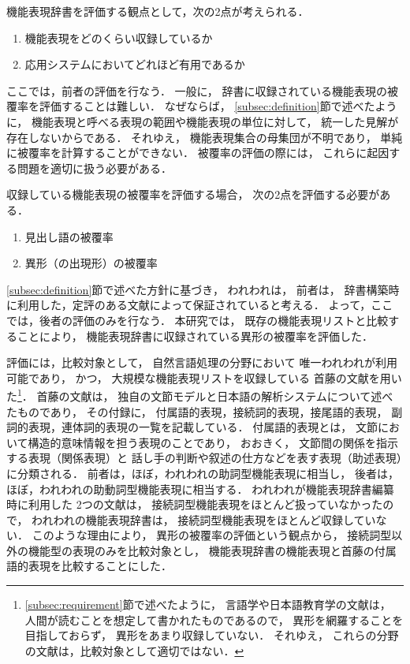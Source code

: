 \documentclass[japanese]{jnlp_1.3e}
\begin{document}
機能表現辞書を評価する観点として，次の2点が考えられる．
\begin{enumerate}
\item 機能表現をどのくらい収録しているか
\item 応用システムにおいてどれほど有用であるか
\end{enumerate}
ここでは，前者の評価を行なう．
一般に，
辞書に収録されている機能表現の被覆率を評価することは難しい．
なぜならば，
\ref{subsec:definition}節で述べたように，
機能表現と呼べる表現の範囲や機能表現の単位に対して，
統一した見解が存在しないからである．
それゆえ，
機能表現集合の母集団が不明であり，
単純に被覆率を計算することができない．
被覆率の評価の際には，
これらに起因する問題を適切に扱う必要がある．

収録している機能表現の被覆率を評価する場合，
次の2点を評価する必要がある．
\begin{enumerate}
\item 見出し語の被覆率
\item 異形（の出現形）の被覆率
\end{enumerate}
\ref{subsec:definition}節で述べた方針に基づき，
われわれは，
前者は，
辞書構築時に利用した，定評のある文献によって保証されていると考える．
よって，ここでは，後者の評価のみを行なう．
本研究では，
既存の機能表現リストと比較することにより，
機能表現辞書に収録されている異形の被覆率を評価した．

評価には，比較対象として，
自然言語処理の分野において
唯一われわれが利用可能であり，
かつ，
大規模な機能表現リストを収録している
首藤の文献を用いた\footnote{
\ref{subsec:requirement}節で述べたように，
言語学や日本語教育学の文献は，
人間が読むことを想定して書かれたものであるので，
異形を網羅することを目指しておらず，
異形をあまり収録していない．
それゆえ，
これらの分野の文献は，比較対象として適切ではない．}．
首藤の文献は，
独自の文節モデルと日本語の解析システムについて述べたものであり，
その付録に，
付属語的表現，接続詞的表現，接尾語的表現，
副詞的表現，連体詞的表現の一覧を記載している．
付属語的表現とは，
文節において構造的意味情報を担う表現のことであり，
おおきく，
文節間の関係を指示する表現（関係表現）と
話し手の判断や叙述の仕方などを表す表現（助述表現）に分類される．
前者は，ほぼ，われわれの助詞型機能表現に相当し，
後者は，ほぼ，われわれの助動詞型機能表現に相当する．
われわれが機能表現辞書編纂時に利用した
2つの文献は，
接続詞型機能表現をほとんど扱っていなかったので，
われわれの機能表現辞書は，
接続詞型機能表現をほとんど収録していない．
このような理由により，
異形の被覆率の評価という観点から，
接続詞型以外の機能型の表現のみを比較対象とし，
機能表現辞書の機能表現と首藤の付属語的表現を比較することにした．
\end{document}
